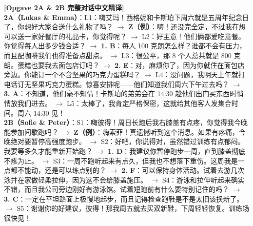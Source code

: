 \begin{transbox}
\small
\textbf{\color{NCDTeal}[Opgave 2A \& 2B 完整对话中文精译]}\\
\textbf{2A（Lukas \& Emma）}：L1：嗨艾玛！西格妮和卡斯珀下周六就是五周年纪念日了，你想好大家合送什么礼物了吗？ $\rightarrow$ \textbf{Z（例）}：嗨！还没完全定，不过我在想可以送一家好餐厅的礼品卡，你觉得呢？ $\rightarrow$ L2：好主意！他们俩都爱吃意餐。你觉得每人出多少钱合适？ $\rightarrow$ \textbf{1. B}：每人 100 克朗怎么样？谁都不会有压力，而且配咖啡我们也得准备点甜点。 $\rightarrow$ L3：很公平，那 8 个人总共就是 800 克朗。蛋糕也要我去面包店订吗？ $\rightarrow$ \textbf{2. E}：对，麻烦你了，因为你就住在面包店旁边。你能订一个不含坚果的巧克力蛋糕吗？ $\rightarrow$ L4：没问题，我明天上午就打电话订无坚果巧克力蛋糕。惊喜安排呢——他们知道我们周六下午过去吗？ $\rightarrow$ \textbf{3. A}：不知道，他们毫不知情！卡斯珀的弟弟会在 14:30 趁他们出门买东西时悄悄放我们进去。 $\rightarrow$ L5：太棒了，我肯定严格保密，这就给其他客人发集合时间。周六 14:30 见！\\[4pt]
\textbf{2B（Sofie \& Peter）}：S1：嗨彼得！周日长跑后我右膝盖有点疼，你觉得我今晚能参加间歇跑吗？ $\rightarrow$ \textbf{Z（例）}：嗨索菲！真遗憾听到这个消息。如果有疼痛，今晚绝对要暂停高强度跑步。 $\rightarrow$ S2：好吧，你说得对，虽然错过训练有点郁闷。我要等多久才能重新开始跑？ $\rightarrow$ \textbf{1. D}：我建议你暂停跑步一周，直到膝盖彻底不疼为止。 $\rightarrow$ S3：一周不跑听起来有点久，但我也不想落下重伤。这周我是一点都不能动，还是可以练点别的？ $\rightarrow$ \textbf{2. F}：可以保持身体活动。试着去游几次泳并在家做轻柔拉伸，因为这不会给膝盖施压。 $\rightarrow$ S4：游泳和拉伸听起来确实不错，而且我公司旁边刚好有游泳馆。试着短跑前有什么要特别记住的吗？ $\rightarrow$ \textbf{3. C}：一定在平坦路面上极慢地起步，而且记得检查跑鞋是不是太旧该换新了。 $\rightarrow$ S5：谢谢你的好建议，彼得！那我周五就去买双新鞋，下周轻轻恢复。训练场很快见！
\end{transbox}

